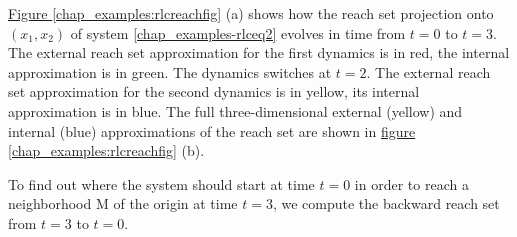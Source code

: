 \documentclass[letterpaper,10pt,english]{sphinxmanual}
\begin{document}
\hyperref[chap_examples:rlcreachfig]{Figure  \ref*{chap_examples:rlcreachfig}} (a) shows how the reach set projection onto
\((x_1, x_2)\) of system \eqref{chap_examples-rlceq2} evolves in time from \(t=0\)
to \(t=3\). The external reach set approximation for the first
dynamics is in red, the internal approximation is in green. The dynamics
switches at \(t=2\). The external reach set approximation for the
second dynamics is in yellow, its internal approximation is in blue. The
full three-dimensional external (yellow) and internal (blue)
approximations of the reach set are shown in \hyperref[chap_examples:rlcreachfig]{figure  \ref*{chap_examples:rlcreachfig}} (b).

To find out where the system should start at time \(t=0\) in order
to reach a neighborhood M of the origin at time \(t=3\), we compute
the backward reach set from \(t=3\) to \(t=0\).
\end{document}
